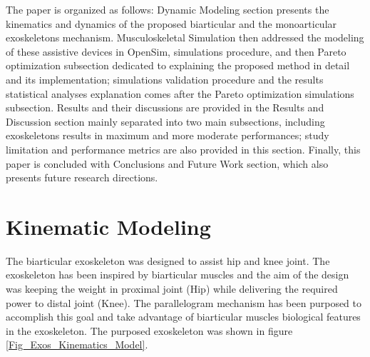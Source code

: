 \documentclass[10pt,letterpaper]{article}
\begin{document}
The paper is organized as follows: Dynamic Modeling section presents the kinematics and dynamics of the proposed biarticular and the monoarticular exoskeletons mechanism. Musculoskeletal Simulation then addressed the modeling of these assistive devices in OpenSim, simulations procedure, and then Pareto optimization subsection dedicated to explaining the proposed method in detail and its implementation; simulations validation procedure and the results statistical analyses explanation comes after the Pareto optimization simulations subsection. Results and their discussions are provided in the Results and Discussion section mainly separated into two main subsections, including exoskeletons results in maximum and more moderate performances; study limitation and performance metrics are also provided in this section. Finally, this paper is concluded with Conclusions and Future Work section, which also presents future research directions.
\section*{Kinematic Modeling}
The biarticular exoskeleton was designed to assist hip and knee joint. The exoskeleton has been inspired by biarticular muscles and the aim of the design was keeping the weight in proximal joint (Hip) while delivering the required power to distal joint (Knee). The parallelogram mechanism has been purposed to accomplish this goal and take advantage of biarticular muscles biological features in the exoskeleton.  The purposed exoskeleton was shown in figure \ref{Fig_Exos_Kinematics_Model}.
\end{document}
